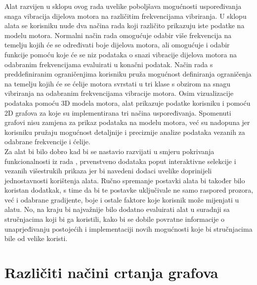 \documentclass[times, utf8, diplomski]{fer}
\begin{document}
Alat razvijen u sklopu ovog rada uvelike poboljšava mogućnosti uspoređivanja snaga vibracija dijelova motora na različitim frekvencijama vibriranja. U sklopu alata se korisniku nude dva načina rada koji različito prikazuju iste podatke na modelu motora. Normalni način rada omogućuje odabir više frekvencija na temelju kojih će se određivati boje dijelova motora, ali omogućuje i odabir funkcije pomoću koje će se niz podataka o snazi vibracije dijelova motora na odabranim frekvencijama evaluirati u konačni podatak. Način rada s preddefiniranim ograničenjima korisniku pruža mogućnost definiranja ograničenja na temelju kojih će se ćelije motora svrstati u tri klase s obzirom na snagu vibriranja na odabranim frekvencijama vibracije motora. Osim vizualizacije podataka pomoću 3D modela motora, alat prikazuje podatke korisniku i pomoću 2D grafova za koje su implementirana tri načina uspoređivanja. Spomenuti grafovi nisu zamjena za prikaz podataka na modelu motora, već su nadopuna jer korisniku pružaju mogućnost detaljnije i preciznije analize podataka vezanih za odabrane frekvencije i ćelije.\\

Za alat bi bilo dobro kad bi se nastavio razvijati u smjeru pokrivanja funkcionalnosti iz rada \citep{matkovic2021getting}, prvenstveno dodataka poput interaktivne selekcije i vezanih višestrukih prikaza jer bi navedeni dodaci uvelike doprinijeli jednostavnosti korištenja alata. Ručno spremanje postavki alata bi također bilo koristan dodatkak, s time da bi te postavke uključivale ne samo raspored prozora, već i odabrane gradijente, boje i ostale faktore koje korisnik može mijenjati u alatu. No, na kraju bi najvažnije bilo dodatno evaluirati alat u suradnji sa stručnjacima koji bi ga koristili, kako bi se dobile povratne informacije o unaprjeđivanju postojećih i implementaciji novih mogućnosti koje bi stručnjacima bile od velike koristi.




\appendix
\chapter{Različiti načini crtanja grafova} \label{appendix:graph-display-examples}
\end{document}
